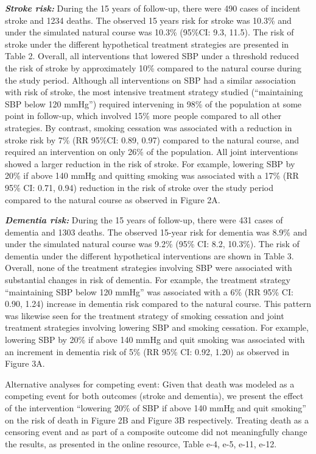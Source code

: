 \documentclass[
]{book}
\begin{document}
\textbf{\emph{Stroke risk:}} During the 15 years of follow-up, there were 490 cases of incident stroke and 1234 deaths. The observed 15 years risk for stroke was 10.3\% and under the simulated natural course was 10.3\% (95\%CI: 9.3, 11.5). The risk of stroke under the different hypothetical treatment strategies are presented in Table 2. Overall, all interventions that lowered SBP under a threshold reduced the risk of stroke by approximately 10\% compared to the natural course during the study period. Although all interventions on SBP had a similar association with risk of stroke, the most intensive treatment strategy studied (``maintaining SBP below 120 mmHg'') required intervening in 98\% of the population at some point in follow-up, which involved 15\% more people compared to all other strategies. By contrast, smoking cessation was associated with a reduction in stroke risk by 7\% (RR 95\%CI: 0.89, 0.97) compared to the natural course, and required an intervention on only 26\% of the population. All joint interventions showed a larger reduction in the risk of stroke. For example, lowering SBP by 20\% if above 140 mmHg and quitting smoking was associated with a 17\% (RR 95\% CI: 0.71, 0.94) reduction in the risk of stroke over the study period compared to the natural course as observed in Figure 2A.

\textbf{\emph{Dementia risk:}} During the 15 years of follow-up, there were 431 cases of dementia and 1303 deaths. The observed 15-year risk for dementia was 8.9\% and under the simulated natural course was 9.2\% (95\% CI: 8.2, 10.3\%). The risk of dementia under the different hypothetical interventions are shown in Table 3. Overall, none of the treatment strategies involving SBP were associated with substantial changes in risk of dementia. For example, the treatment strategy ``maintaining SBP below 120 mmHg'' was associated with a 6\% (RR 95\% CI: 0.90, 1.24) increase in dementia risk compared to the natural course. This pattern was likewise seen for the treatment strategy of smoking cessation and joint treatment strategies involving lowering SBP and smoking cessation. For example, lowering SBP by 20\% if above 140 mmHg and quit smoking was associated with an increment in dementia risk of 5\% (RR 95\% CI: 0.92, 1.20) as observed in Figure 3A.

Alternative analyses for competing event: Given that death was modeled as a competing event for both outcomes (stroke and dementia), we present the effect of the intervention ``lowering 20\% of SBP if above 140 mmHg and quit smoking'' on the risk of death in Figure 2B and Figure 3B respectively. Treating death as a censoring event and as part of a composite outcome did not meaningfully change the results, as presented in the online resource, Table e-4, e-5, e-11, e-12.
\end{document}
